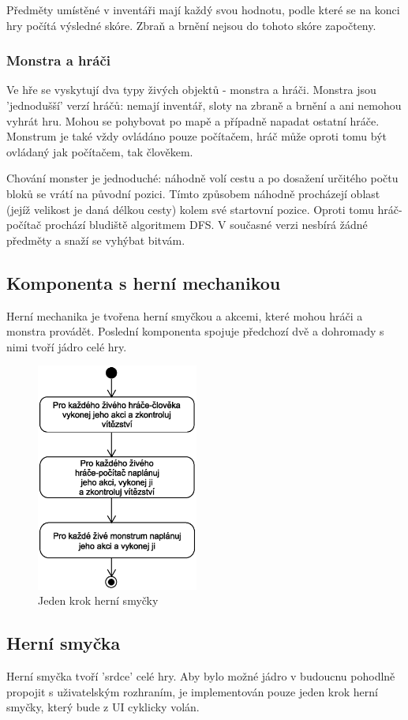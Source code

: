 \documentclass[11pt,a4paper]{scrartcl}
\begin{document}
	Předměty umístěné v inventáři mají každý svou hodnotu, podle které se na konci hry počítá výsledné skóre. Zbraň a brnění nejsou do tohoto skóre započteny.
	
	\subsubsection{Monstra a hráči}
	Ve hře se vyskytují dva typy živých objektů - monstra a hráči. Monstra jsou 'jednodušší' verzí hráčů: nemají inventář, sloty na zbraně a brnění a ani nemohou vyhrát hru. Mohou se pohybovat po mapě a případně napadat ostatní hráče. Monstrum je také vždy ovládáno pouze počítačem, hráč může oproti tomu být ovládaný jak počítačem, tak člověkem.
	
	Chování monster je jednoduché: náhodně volí cestu a po dosažení určitého počtu bloků se vrátí na původní pozici. Tímto způsobem náhodně procházejí oblast (jejíž velikost je daná délkou cesty) kolem své startovní pozice. Oproti tomu hráč-počítač prochází bludiště algoritmem DFS. V současné verzi nesbírá žádné předměty a snaží se vyhýbat bitvám.
	
	\subsection{Komponenta s herní mechanikou}
	Herní mechanika je tvořena herní smyčkou a akcemi, které mohou hráči a monstra provádět. Poslední komponenta spojuje předchozí dvě a dohromady s nimi tvoří jádro celé hry.
	
			\begin{figure}[H]
				\centering
				\includegraphics[height=75mm]{game-loop-simple}
				\caption{Jeden krok herní smyčky}
				\label{fig:game-loop}
			\end{figure}
	
	\subsection{Herní smyčka}
	Herní smyčka tvoří 'srdce' celé hry. Aby bylo možné jádro v budoucnu pohodlně propojit s uživatelským rozhraním, je implementován pouze jeden krok herní smyčky, který bude z UI cyklicky volán. 
	
\end{document}
